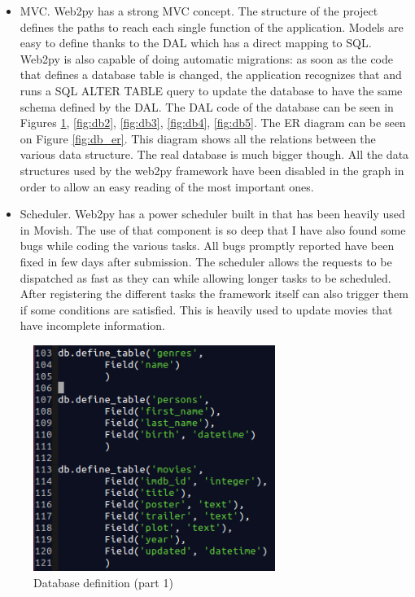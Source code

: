 \begin{itemize}
\item \ac{MVC}. Web2py has a strong \ac{MVC} concept. The structure of the project defines the paths to reach each single function of the application. Models are easy to define thanks to the \ac{DAL} which has a direct mapping to \ac{SQL}. Web2py is also capable of doing automatic migrations: as soon as the code that defines a database table is changed, the application recognizes that and runs a \ac{SQL} ALTER TABLE query to update the database to have the same schema defined by the \ac{DAL}.
The \ac{DAL} code of the database can be seen in Figures \ref{fig:db1}, \ref{fig:db2}, \ref{fig:db3}, \ref{fig:db4}, \ref{fig:db5}. 
The \ac{ER} diagram can be seen on Figure \ref{fig:db_er}. This diagram shows all the relations between the various data structure. The real database is much bigger though. All the data structures used by the web2py framework have been disabled in the graph in order to allow an easy reading of the most important ones.
\item Scheduler. Web2py has a power scheduler built in that has been heavily used in Movish. The use of that component is so deep that I have also found some bugs while coding the various tasks. All bugs promptly reported have been fixed in few days after submission. The scheduler allows the requests to be dispatched as fast as they can while allowing longer tasks to be scheduled. After registering the different tasks the framework itself can also trigger them if some conditions are satisfied. This is heavily used to update movies that have incomplete information.
\end{itemize}

\begin{figure}
  \centering
  \includegraphics[width=0.7\textwidth]{figures/db1.png}
  \caption{Database definition (part 1)}
  \label{fig:db1}
\end{figure}

